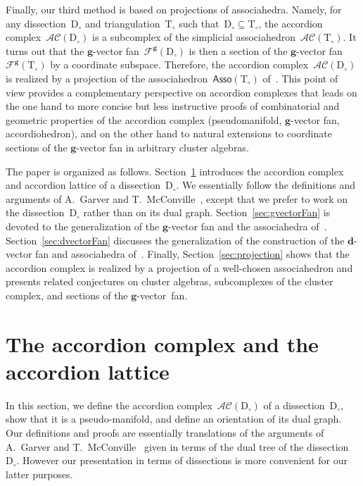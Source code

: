 \documentclass{amsart}
\theoremstyle{definition}
\renewcommand{\b}[1]{\mathbf{#1}} %
\newcommand{\Asso}{\mathsf{Asso}} %
\newcommand{\accordionComplex}{\mathcal{AC}} %
\newcommand{\triangulation}{\mathrm{T}} %
\newcommand{\dissection}{\mathrm{D}} %
\newcommand{\gvectorFan}{\mathcal{F}^\mathbf{g}} %
\begin{document}
Finally, our third method is based on projections of associahedra. Namely, for any dissection~$\dissection_\circ$ and triangulation~$\triangulation_\circ$ such that~$\dissection_\circ \subseteq \triangulation_\circ$, the accordion complex~$\accordionComplex(\dissection_\circ)$ is a subcomplex of the simplicial associahedron~$\accordionComplex(\triangulation_\circ)$. It turns out that the $\b{g}$-vector fan~$\gvectorFan(\dissection_\circ)$ is then a section of the $\b{g}$-vector fan~$\gvectorFan(\triangulation_\circ)$ by a coordinate subspace. Therefore, the accordion complex~$\accordionComplex(\dissection_\circ)$ is realized by a projection of the associahedron~$\Asso(\triangulation_\circ)$ of~\cite{HohlwegPilaudStella}. This point of view provides a complementary perspective on accordion complexes that leads on the one hand to more concise but less instructive proofs of combinatorial and geometric properties of the accordion complex (pseudomanifold, $\b{g}$-vector fan, accordiohedron), and on the other hand to natural extensions to coordinate sections of the $\b{g}$-vector fan in arbitrary cluster algebras.

The paper is organized as follows. Section~\ref{sec:accordionComplex} introduces the accordion complex and accordion lattice of a dissection~$\dissection_\circ$. We essentially follow the definitions and arguments of A.~Garver and T.~McConville~\cite{GarverMcConville}, except that we prefer to work on the dissection~$\dissection_\circ$ rather than on its dual graph. Section~\ref{sec:gvectorFan} is devoted to the generalization of the $\b{g}$-vector fan and the associahedra of~\cite{HohlwegLange, HohlwegPilaudStella}. Section~\ref{sec:dvectorFan} discusses the generalization of the construction of the $\b{d}$-vector fan and associahedra of~\cite{FominZelevinsky-ClusterAlgebrasII, CeballosSantosZiegler}. Finally, Section~\ref{sec:projection} shows that the accordion complex is realized by a projection of a well-chosen associahedron and presents related conjectures on cluster algebras, subcomplexes of the cluster complex, and sections of the $\b{g}$-vector~fan.


\section{The accordion complex and the accordion lattice}
\label{sec:accordionComplex}

In this section, we define the accordion complex~$\accordionComplex(\dissection_\circ)$ of a dissection~$\dissection_\circ$, show that it is a pseudo-manifold, and define an orientation of its dual graph. Our definitions and proofs are essentially translations of the arguments of A.~Garver and T.~McConville~\cite{GarverMcConville} given in terms of the dual tree of the dissection~$\dissection_\circ$. However our presentation in terms of dissections is more convenient for our latter purposes.
\end{document}
